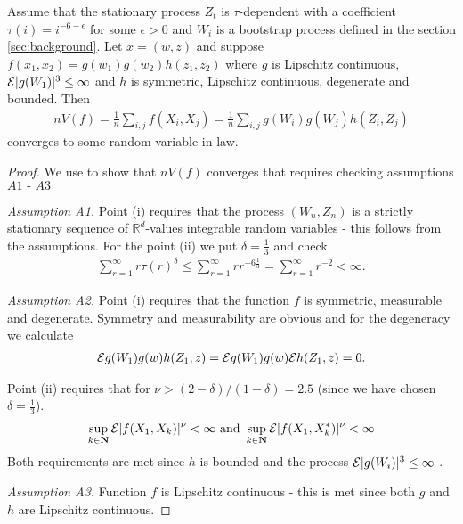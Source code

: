 \begin{lemma}
\label{lem:convergence2012}
Assume that the stationary process $Z_t$ is $\tau$-dependent with a coefficient $\tau(i) = i^{-6-\epsilon}$ for some $\epsilon>0$ and $W_i$ is a bootstrap process defined in the section \ref{sec:background}. Let $x=(w,z)$ and suppose $f(x_1,x_2) = g(w_1)g(w_2) h(z_1,z_2)$ where $g$ is Lipschitz continuous, $\mathcal{E} |g(W_1)|^3 \leq \infty$ and $h$ is symmetric, Lipschitz continuous, degenerate and bounded. Then 
\begin{align}
n V(f)= \frac 1 n \sum_{i,j} f(X_i,X_j) = \frac 1 n \sum_{i,j} g(W_i) g(W_j) h(Z_i,Z_j) 
\end{align}
converges to some random variable in law.   
\end{lemma}
\begin{proof}
We use  \cite[Theorem 2.1]{leucht2012degenerate} to show that $n V(f)$ converges that requires checking assumptions $\textit{A1 - A3}$ 

\textit{Assumption A1.} Point (i) requires that the process $(W_n,Z_n)$ is a strictly stationary sequence of $\mathbb{R}^d$-values integrable random variables - this follows from the assumptions. For the point (ii) we put $\delta=\frac 1 3$ and check
\begin{align}
\sum_{r=1}^{\infty} r \tau(r)^{\delta} \leq \sum_{r=1}^{\infty} r r^{-6 \frac 1 3} = \sum_{r=1}^{\infty} r^{-2} < \infty. 
\end{align}

\textit{Assumption A2.} Point (i) requires that the function $f$ is symmetric, measurable and
degenerate. Symmetry and measurability are obvious and for the degeneracy we calculate 
\begin{align}
\mathcal{E} g(W_1) g(w) h(Z_1,z) =  \mathcal{E} g(W_1) g(w) \mathcal{E} h(Z_1,z) = 0.
\end{align}  

 Point (ii) requires that for $\nu > (2-\delta)/(1-\delta) = 2.5$ (since we have chosen $\delta=\frac 1 3$).
\begin{align}
\sup_{k \in \mathbf{N}} \mathcal{E} |f(X_1,X_k)|^{\nu} < \infty \text{ and } \sup_{k \in \mathbf{N}} \mathcal{E} |f(X_1,X_k^*)|^{\nu} < \infty
\end{align}
Both requirements are met since $h$ is bounded and the process $\mathcal{E} |g(W_i)|^3 \leq \infty$ .

\textit{Assumption A3.} Function $f$ is Lipschitz continuous - this is met since both $g$ and $h$ are Lipschitz continuous.   
\end{proof}




